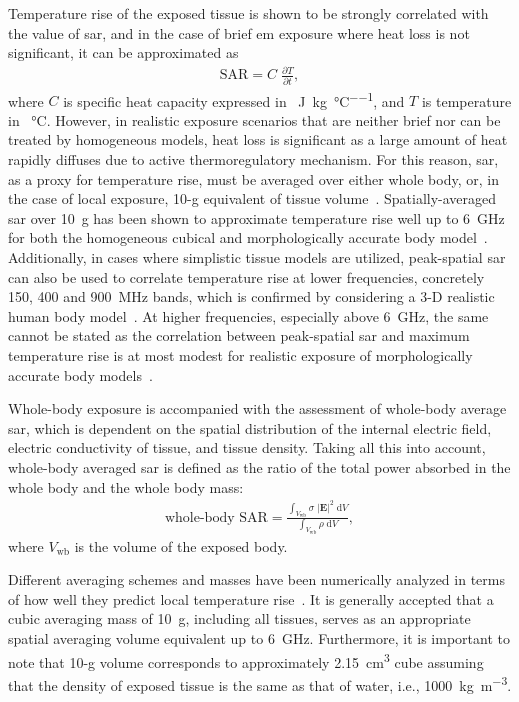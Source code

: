 Temperature rise of the exposed tissue is shown to be strongly correlated with the value of \gls{sar}, and in the case of brief \gls{em} exposure where heat loss is not significant, it can be approximated as
\begin{align}
    \label{eqn:sar_4}
    \text{SAR} = C \; \frac{\partial T}{\partial t},
\end{align}
where $C$ is specific heat capacity expressed in \SI{}{\joule\per\kg\per\celsius}, and $T$ is temperature in \SI{}{\celsius}.
However, in realistic exposure scenarios that are neither brief nor can be treated by homogeneous models, heat loss is significant as a large amount of heat rapidly diffuses due to active thermoregulatory mechanism.
For this reason, \gls{sar}, as a proxy for temperature rise, must be averaged over either whole body, or, in the case of local exposure, 10-g equivalent of tissue volume~\cite{McIntosh2011SAR}.
Spatially-averaged \gls{sar} over \SI{10}{g} has been shown to approximate temperature rise well up to \SI{6}{\GHz} for both the homogeneous cubical and morphologically accurate body model~\cite{Hirata2009correlation}.
Additionally, in cases where simplistic tissue models are utilized, peak-spatial \gls{sar} can also be used to correlate temperature rise at lower frequencies, concretely \SI{150}{}, \SI{400}{} and \SI{900}{\MHz} bands, which is confirmed by considering a 3-D realistic human body model~\cite{Hirata2006Correlation}.
At higher frequencies, especially above \SI{6}{\GHz}, the same cannot be stated as the correlation between peak-spatial \gls{sar} and maximum temperature rise is at most modest for realistic exposure of morphologically accurate body models~\cite{Morimoto2016Relationship}.

Whole-body exposure is accompanied with the assessment of whole-body average \gls{sar}, which is dependent on the spatial distribution of the internal electric field, electric conductivity of tissue, and tissue density.
Taking all this into account, whole-body averaged \gls{sar} is defined as the ratio of the total power absorbed in the whole body and the whole body mass:
\begin{align}
    \label{eqn:sar_wb}
    \text{whole-body SAR} = \frac{\int_{V_\text{wb}} \sigma \; |\mathbf{E}|^2 \; \mathrm{d}V}{\int_{V_\text{wb}} \rho \; \mathrm{d}V},
\end{align}
where $V_\text{wb}$ is the volume of the exposed body.

Different averaging schemes and masses have been numerically analyzed in terms of how well they predict local temperature rise~\cite{Hirata2009correlation,McIntosh2011SAR}.
It is generally accepted that a cubic averaging mass of \SI{10}{\g}, including all tissues, serves as an appropriate spatial averaging volume equivalent up to \SI{6}{\GHz}.
Furthermore, it is important to note that 10-g volume corresponds to approximately \SI{2.15}{\cm\cubed} cube assuming that the density of exposed tissue is the same as that of water, i.e., \SI{1000}{\kg\per\m\cubed}.


